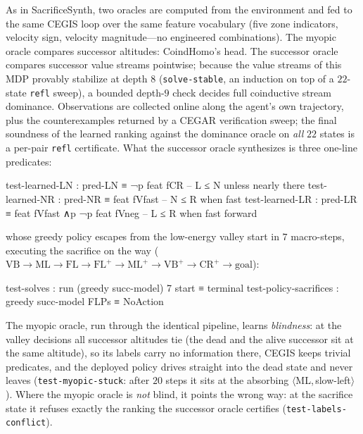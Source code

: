 \documentclass[9pt,a4paper]{article}
\theoremstyle{plain}
\theoremstyle{definition}
\theoremstyle{remark}
\begin{document}
As in SacrificeSynth, two oracles are computed from the environment and fed to the same CEGIS loop over the same feature vocabulary (five zone indicators, velocity sign, velocity magnitude---no engineered combinations).  The myopic oracle compares successor altitudes: CoindHomo's head.  The successor oracle compares successor value streams pointwise; because the value streams of this MDP provably stabilize at depth $8$ (\texttt{solve-stable}, an induction on top of a $22$-state \texttt{refl} sweep), a bounded depth-$9$ check decides full coinductive stream dominance.  Observations are collected online along the agent's own trajectory, plus the counterexamples returned by a CEGAR verification sweep; the final soundness of the learned ranking against the dominance oracle on \emph{all} $22$ states is a per-pair \texttt{refl} certificate.  What the successor oracle synthesizes is three one-line predicates:
\begin{spec}
test-learned-LN : pred-LN ≡ ¬p feat fCR                     -- L ≤ N unless nearly there
test-learned-NR : pred-NR ≡ feat fVfast                     -- N ≤ R when fast
test-learned-LR : pred-LR ≡ feat fVfast ∧p ¬p feat fVneg    -- L ≤ R when fast forward
\end{spec}
whose greedy policy escapes from the low-energy valley start in $7$ macro-steps, executing the sacrifice on the way ($\text{VB}{\to}\text{ML}{\to}\text{FL}{\to}\text{FL}^{+}{\to}\text{ML}^{+}{\to}\text{VB}^{+}{\to}\text{CR}^{+}{\to}\text{goal}$):
\begin{spec}
test-solves            : run (greedy succ-model) 7 start ≡ terminal
test-policy-sacrifices : greedy succ-model FLPs ≡ NoAction
\end{spec}
The myopic oracle, run through the identical pipeline, learns \emph{blindness}: at the valley decisions all successor altitudes tie (the dead and the alive successor sit at the same altitude), so its labels carry no information there, CEGIS keeps trivial predicates, and the deployed policy drives straight into the dead state and never leaves (\texttt{test-myopic-stuck}: after $20$ steps it sits at the absorbing $\langle$ML,\,slow-left$\rangle$).  Where the myopic oracle is \emph{not} blind, it points the wrong way: at the sacrifice state it refuses exactly the ranking the successor oracle certifies (\texttt{test-labels-conflict}).
\end{document}
